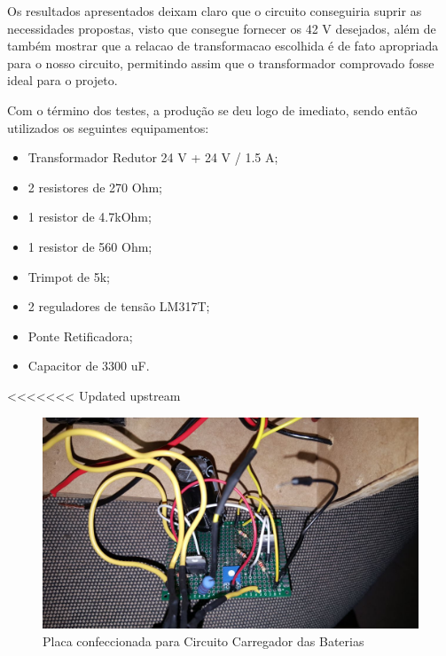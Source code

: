 Os resultados apresentados deixam claro que o circuito conseguiria suprir as necessidades propostas, visto que consegue fornecer os 42 V desejados, além de também mostrar que a relacao de transformacao escolhida é de fato apropriada para o nosso circuito, permitindo assim que o transformador comprovado fosse ideal para o projeto. 

Com o término dos testes, a produção se deu logo de imediato, sendo então utilizados os seguintes equipamentos:

\begin{itemize}
\item Transformador Redutor 24 V + 24 V / 1.5 A;
\item 2 resistores de 270 Ohm;
\item 1 resistor de 4.7kOhm;
\item 1 resistor de 560 Ohm;
\item Trimpot de 5k; 
\item 2 reguladores de tensão LM317T;
\item Ponte Retificadora;
\item Capacitor de 3300 uF.
\end{itemize}

<<<<<<< Updated upstream
\graphicspath{{figuras/}}
\begin{figure}[h]
\centering
\includegraphics[scale=0.30]{placa_confeccionada}
\caption{Placa confeccionada para Circuito Carregador das Baterias}
\label{placa}
\end{figure}

